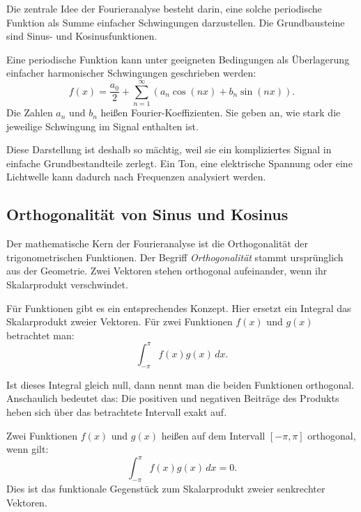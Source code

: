 Die zentrale Idee der Fourieranalyse besteht darin,
eine solche periodische Funktion als Summe einfacher Schwingungen darzustellen.
Die Grundbausteine sind Sinus- und Kosinusfunktionen.

\begin{MathBox}
	\small
	\label{box:anhangA-fourier-grundidee}
	Eine periodische Funktion kann unter geeigneten Bedingungen als Überlagerung
	einfacher harmonischer Schwingungen geschrieben werden:
	\[
	f(x)=\frac{a_0}{2}
	+\sum_{n=1}^{\infty}
	\left(a_n\cos(nx)+b_n\sin(nx)\right).
	\]
	Die Zahlen \(a_n\) und \(b_n\) heißen Fourier-Koeffizienten.
	Sie geben an, wie stark die jeweilige Schwingung im Signal enthalten ist.
\end{MathBox}

Diese Darstellung ist deshalb so mächtig,
weil sie ein kompliziertes Signal in einfache Grundbestandteile zerlegt.
Ein Ton, eine elektrische Spannung oder eine Lichtwelle kann dadurch nach Frequenzen analysiert werden.

\subsection{Orthogonalität von Sinus und Kosinus}

Der mathematische Kern der Fourieranalyse ist die Orthogonalität der trigonometrischen Funktionen.
Der Begriff \emph{Orthogonalität} stammt ursprünglich aus der Geometrie.
Zwei Vektoren stehen orthogonal aufeinander, wenn ihr Skalarprodukt verschwindet.

Für Funktionen gibt es ein entsprechendes Konzept.
Hier ersetzt ein Integral das Skalarprodukt zweier Vektoren.
Für zwei Funktionen \(f(x)\) und \(g(x)\) betrachtet man:
\[
\int_{-\pi}^{\pi} f(x)g(x)\,dx.
\]

Ist dieses Integral gleich null, dann nennt man die beiden Funktionen orthogonal.
Anschaulich bedeutet das:
Die positiven und negativen Beiträge des Produkts heben sich über das betrachtete Intervall exakt auf.

\begin{MathBox}
	\small
	\label{box:anhangA-fourier-orthogonalitaet}
	Zwei Funktionen \(f(x)\) und \(g(x)\) heißen auf dem Intervall
	\([-\pi,\pi]\) orthogonal, wenn gilt:
	\[
	\int_{-\pi}^{\pi} f(x)g(x)\,dx=0.
	\]
	Dies ist das funktionale Gegenstück zum Skalarprodukt zweier senkrechter Vektoren.
\end{MathBox}

